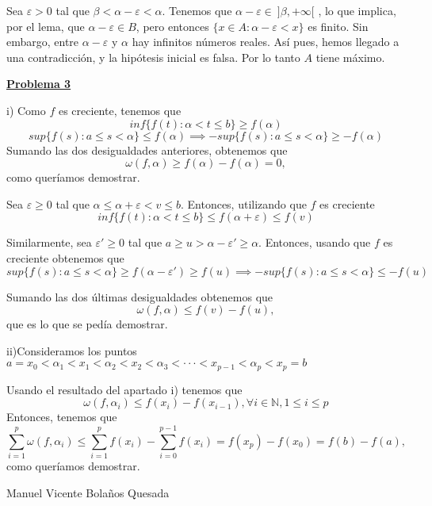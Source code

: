 \documentclass[10pt,a4paper]{article}
\begin{document}
	Sea $\varepsilon > 0$ tal que $\beta < \alpha - \varepsilon < \alpha$. Tenemos que $\alpha - \varepsilon \in ~ ]\beta, +\infty[$ , lo que implica, por el lema, que $\alpha - \varepsilon \in B$, pero entonces $\{x \in A : \alpha - \varepsilon < x\}$ es finito. Sin embargo, entre $\alpha - \varepsilon$ y $\alpha$ hay infinitos números reales. Así pues, hemos llegado a una contradicción, y la hipótesis inicial es falsa. Por lo tanto $A$ tiene máximo.
	
	\begin{flushleft}
		\textbf{\underline{Problema 3}}
	\end{flushleft}
	
	i) Como $f$ es creciente, tenemos que 
	$$inf\{f(t): \alpha < t \leq b\} \geq f(\alpha)$$
	$$sup\{f(s):a \leq s < \alpha\} \leq f(\alpha) \implies -sup\{f(s):a \leq s < \alpha\} \geq -f(\alpha)$$
	Sumando las dos desigualdades anteriores, obtenemos que $$\omega(f, \alpha) \geq f(\alpha) - f(\alpha) = 0,$$ como queríamos demostrar.
	
	Sea $\varepsilon \geq 0$ tal que $\alpha \leq \alpha + \varepsilon < v \leq b$. Entonces, utilizando que $f$ es creciente
	$$inf\{f(t): \alpha < t \leq b\} \leq f(\alpha + \varepsilon) \leq f(v)$$
	
	Similarmente, sea $\varepsilon ' \geq 0$ tal que $a \geq u > \alpha - \varepsilon ' \geq \alpha$. Entonces, usando que $f$ es creciente obtenemos que
	$$sup\{f(s):a \leq s < \alpha\} \geq f(\alpha - \varepsilon ') \geq f(u) \implies -sup\{f(s):a \leq s < \alpha\} \leq -f(u)$$
	
	Sumando las dos últimas desigualdades obtenemos que $$ \omega(f, \alpha) \leq f(v) - f(u),$$ que es lo que se pedía demostrar. \newline
	
	ii)Consideramos los puntos $ a = x_0 < \alpha_1 < x_1 < \alpha_2 < x_2 < \alpha_3 < \cdot \cdot \cdot < x_{p-1} < \alpha_p < x_p = b$
	
	Usando el resultado del apartado i) tenemos que
	$$\omega(f, \alpha_i) \leq f(x_i) - f(x_{i-1}), \forall i \in \mathbb{N}, 1 \leq i \leq p$$
	Entonces, tenemos que $$\sum_{i=1}^{p} \omega(f, \alpha_i) \leq \sum_{i = 1}^{p}f(x_i) - \sum_{i = 0}^{p-1}f(x_i) = f(x_p)-f(x_0) = f(b)-f(a),$$ como queríamos demostrar. \newpage
	
	\begin{flushleft}
		Manuel Vicente Bolaños Quesada	\newline 
	\end{flushleft}	
\end{document}
